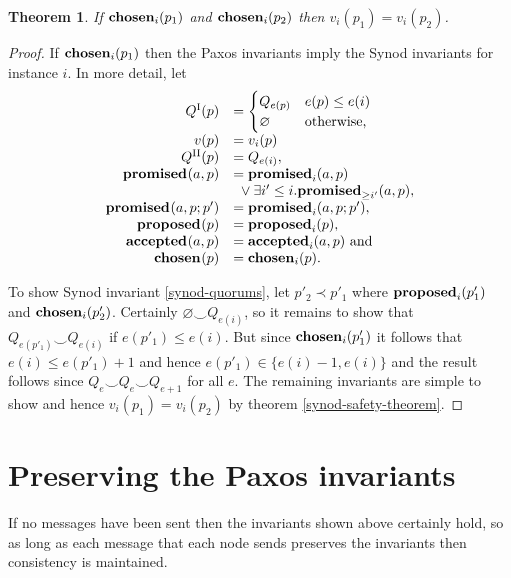 \documentclass[journal]{IEEEtran}
\newtheorem{theorem}{Theorem}
\begin{document}
\begin{theorem}\label{paxos-safety-theorem} If $\mathbf{chosen}_{i}(p_1)$ and
$\mathbf{chosen}_{i}(p_2)$ then ${v_i(p_1) = v_i(p_2)}$.  \end{theorem}

\begin{proof}
If $\mathbf{chosen}_{i}(p_1)$ then the Paxos invariants imply the Synod invariants for
instance $i$.  In more detail, let
\[\begin{array}{rl}
Q^\textrm{I}(p) &= \begin{cases}
Q_{e(p)} & e(p) \le e(i) \\
\varnothing & \textrm{otherwise,} \end{cases} \\
v(p) &= v_i(p)\\
Q^\textrm{II}(p) &= Q_{e(i)}, \\
\mathbf{promised}_{}(a,p) &= \mathbf{promised}_{i}(a,p) \\
& \ {}\vee \exists i' \le i. \mathbf{promised}_{\ge i'}(a,p), \\
\mathbf{promised}_{}(a,p;p') &= \mathbf{promised}_{i}(a,p;p'), \\
\mathbf{proposed}_{}(p) &= \mathbf{proposed}_{i}(p), \\
\mathbf{accepted}_{}(a,p) &= \mathbf{accepted}_{i}(a,p) \textrm{ and} \\
\mathbf{chosen}_{}(p) &= \mathbf{chosen}_{i}(p). \\
\end{array}
\]

To show Synod invariant \ref{synod-quorums}, let $p'_2 \prec p'_1$ where
$\mathbf{proposed}_{i}(p'_1)$ and $\mathbf{chosen}_{i}(p'_2)$. Certainly $\varnothing \smile
Q_{e(i)}$, so it remains to show that $Q_{e(p'_1)} \smile Q_{e(i)}$ if $e(p'_1)
\le e(i)$.  But since $\mathbf{chosen}_{i}(p'_1)$ it follows that $e(i) \le e(p'_1) + 1$
and hence $e(p'_1) \in \{e(i) - 1, e(i)\}$ and the result follows since ${Q_e
\smile Q_e \smile Q_{e+1}}$ for all $e$. The remaining invariants are simple to
show and hence $v_i(p_1) = v_i(p_2)$ by theorem \ref{synod-safety-theorem}.
\end{proof}

\section{Preserving the Paxos invariants}

If no messages have been sent then the invariants shown above certainly hold,
so as long as each message that each node sends preserves the invariants then
consistency is maintained.
\end{document}
